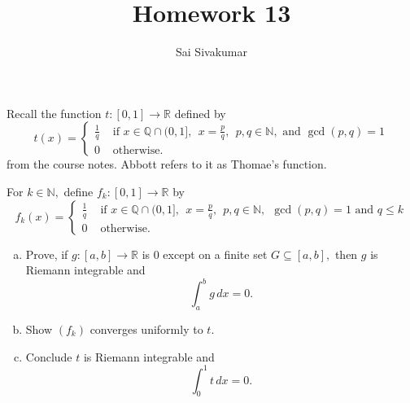 \documentclass[12pt]{amsart}
\title{Homework 13}
\author{Sai Sivakumar}
\newcommand{\RR}{\mathbb{R}}
\newcommand{\NN}{\mathbb{N}}
\newcommand{\QQ}{\mathbb{Q}}
\begin{document}
\maketitle

Recall the function  $t:[0,1]\to \RR$ defined by
\[
  t(x) =\begin{cases} %
   \frac{1}{q} & \mbox{ if } x\in \QQ \cap (0,1], \ \ 
         x=\frac{p}{q}, \ \ p,q\in \NN, \mbox{ and } \gcd(p,q)=1 \\
     0& \mbox{ otherwise}.
\end{cases}
\] 
from the course notes. Abbott refers to it as Thomae's function.

For $k\in \NN,$ define $f_k:[0,1]\to\RR$ by 
\[
  f_k(x) =\begin{cases} %
   \frac{1}{q} & \mbox{ if }  x\in \QQ\cap (0,1], \ \ 
         x=\frac{p}{q}, \ \ p,q\in \NN, \ \ \gcd(p,q)=1 
  \mbox{ and } q\le k \\
     0& \mbox{ otherwise. } 
\end{cases}
\]

\bigskip

\begin{enumerate}[(a)] \itemsep=8pt
  \item Prove, if $g:[a,b]\to\RR$ is $0$ except 
  on a finite set $G\subseteq [a,b],$ then
 $g$ is Riemann integrable and 
\[
 \int_a^b g\, dx =0.
\]
 \item Show $(f_k)$ converges uniformly to $t.$ 
 \item  Conclude $t$ is
 Riemann integrable and
\[
 \int_0^1 t\, dx =0.
\]
\end{enumerate}

\bigskip
\end{document}
